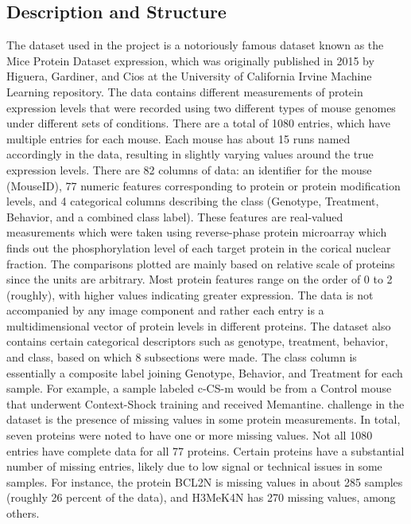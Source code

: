 \documentclass[a4paper,12pt]{article}
\begin{document}
\subsection{Description and Structure}
The dataset used in the project is a notoriously famous dataset known as the Mice Protein Dataset expression, which was originally published in 2015 by Higuera, Gardiner, and Cios at the University of California Irvine Machine Learning repository. \cite{higuera2015mice} 
\newline
The data contains different measurements of protein expression levels that were recorded using two different types of mouse genomes under different sets of conditions. There are a total of 1080 entries, which have multiple entries for each mouse. Each mouse has about 15 runs named accordingly in the data, resulting in slightly varying values around the true expression levels.
\newline
There are 82 columns of data: an identifier for the mouse (MouseID), 77 numeric features corresponding to protein or protein modification levels, and 4 categorical columns describing the class (Genotype, Treatment, Behavior, and a combined class label). These features are real-valued measurements which were taken using reverse-phase protein microarray which finds out the phosphorylation level of each target protein in the corical nuclear fraction. 
\newline
The comparisons plotted are mainly based on relative scale of proteins since the units are arbitrary. Most protein features range on the order of 0 to 2 (roughly), with higher values indicating greater expression. The data is not accompanied by any image component and rather each entry is a multidimensional vector of protein levels in different proteins. The dataset also contains certain categorical descriptors such as genotype, treatment, behavior, and class, based on which 8 subsections were made. The class column is essentially a composite label joining Genotype, Behavior, and Treatment for each sample. For example, a sample labeled c-CS-m would be from a Control mouse that underwent Context-Shock training and received Memantine. 
\newline
challenge in the dataset is the presence of missing values in some protein measurements. In total, seven proteins were noted to have one or more missing values. Not all 1080 entries have complete data for all 77 proteins. Certain proteins have a substantial number of missing entries, likely due to low signal or technical issues in some samples. For instance, the protein BCL2N is missing values in about 285 samples (roughly 26 percent of the data), and H3MeK4N has 270 missing values, among others. 
\end{document}
